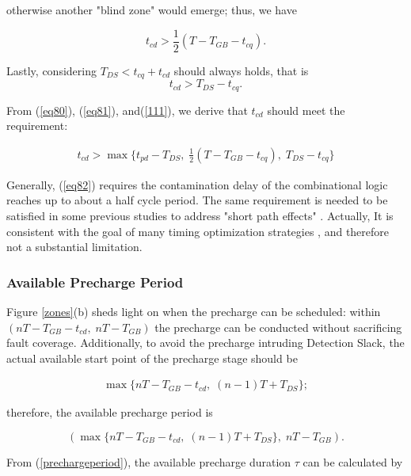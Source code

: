 otherwise another "blind zone" would emerge; thus, we have

\begin{equation}\label{eq81}
  t_{cd} > \frac{1}{2}(T-T_{GB}-t_{cq}).
\end{equation}

Lastly, considering  $T_{DS}<t_{cq}+t_{cd}$ should always holds, that is
\begin{equation}\label{111}
  t_{cd}>T_{DS}-t_{cq}.
\end{equation}

From (\ref{eq80}), (\ref{eq81}), and(\ref{111}), we derive that $t_{cd}$ should meet the requirement:

\begin{eqnarray}\label{eq82}
  t_{cd} >  \max \{t_{pd} - T_{DS},\; \frac{1}{2}(T-T_{GB}-t_{cq}),\; T_{DS}-t_{cq}\}
\end{eqnarray}

Generally, (\ref{eq82}) requires the contamination delay of the combinational logic reaches up to about a half cycle period. The same requirement is needed to be satisfied in some previous studies \cite{lowcost_date07} to address "short path effects" \cite{Nicolaidis_ITC07}. Actually, It is consistent with the goal of many timing optimization strategies \cite{Delay_Insertion_06}\cite{Padding_93}, and therefore not a substantial limitation.

\subsubsection{Available Precharge Period}
Figure \ref{zones}(b) sheds light on when the precharge can be scheduled: within $(nT-T_{GB}-t_{cd},\; nT-T_{GB})$ the precharge can be conducted without sacrificing fault coverage. Additionally, to avoid the precharge intruding Detection Slack, the actual available start point of the precharge stage should be

\begin{eqnarray}\label{eq5}
\max\{nT-T_{GB}-t_{cd},\;(n-1)T+T_{DS} \};
\end{eqnarray}

therefore, the available precharge period is

\begin{equation}\label{prechargeperiod}
(\max\{nT-T_{GB}-t_{cd},\;(n-1)T+T_{DS} \},\; nT-T_{GB}).
\end{equation}

From (\ref{prechargeperiod}), the available precharge duration $\tau$ can be calculated by

